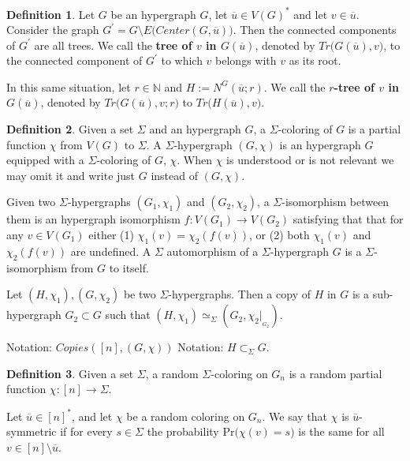 \documentclass[12pt,notitlepage,a4paper]{article}
\theoremstyle{definition}
\newtheorem{definition}{Definition}[section]
\newcommand{\N}{\mathbb{N}}
\begin{document}
\begin{definition}
	Let $G$ be an hypergraph $G$, let $\overline{u}\in V(G)^*$
	and let $v\in \overline{u}$.
	Consider the graph $G^\prime= G\setminus 
	E\big(Center(G,\overline{u})\big)$. Then the connected components of
	$G^\prime$ are all trees. We call the \textbf{tree of $v$ in
	$G(\overline{u})$}, denoted by $Tr\big(G(\overline{u}),v\big)$,
	to the connected component of $G^\prime$ to which $v$ belongs
	with $v$ as its root. \par   
	In this same situation, let $r\in \N$ and $H:=N^G(\overline{u};r)$.
	We call the \textbf{$r$-tree of $v$ in $G(\overline{u})$}, 
	denoted by $Tr\big(G(\overline{u}),v;r\big)$ to 
	$Tr\big(H(\overline{u}),v\big)$.
\end{definition}

\newpage

\begin{definition} 
	Given a set $\Sigma$ and an hypergraph $G$, a $\Sigma$-coloring 
	of $G$ is a partial function $\chi$ from $V(G)$ to $\Sigma$. 
	A $\Sigma$-hypergraph $(G,\chi)$ is an hypergraph $G$ equipped
	with a $\Sigma$-coloring of $G$, $\chi$. When $\chi$ is understood
	or is not relevant we may omit it and write just $G$ instead of $(G,\chi)$.\par
	Given two $\Sigma$-hypergraphs $(G_1,\chi_1)$ and $(G_2,\chi_2)$,
	a $\Sigma$-isomorphism between them is an hypergraph isomorphism 
	$f:V(G_1)\rightarrow V(G_2)$ satisfying that
	that for any $v\in V(G_1)$ 
	either (1) $\chi_1(v)=\chi_2(f(v))$, or (2) both $\chi_1(v)$ and $\chi_2(f(v))$ 
	are undefined.	A $\Sigma$ automorphism of a $\Sigma$-hypergraph $G$ is a 
	$\Sigma$-isomorphism from $G$ to itself.
	 \par
	Let $(H,\chi_1), (G,\chi_2)$ be two $\Sigma$-hypergraphs. Then a copy of $H$ in $G$ is
	a sub-hypergraph $G_2\subset G$ such that 
	$(H,\chi_1) \simeq_\Sigma (G_2,\chi_2|_{_{G_2}})$.	\par
	
	Notation: $Copies([n],(G, \chi))$
	Notation: $H\subset_{\Sigma}G$.

\end{definition}
\begin{definition}
	Given a set $\Sigma$, a random $\Sigma$-coloring on $G_n$ is a random 
	partial function $\chi : [n]\rightarrow \Sigma$. \par
	Let $\overline{u}\in [n]^*$, and let $\chi$ be a random coloring on 
	$G_n$. We say that $\chi$ is $\overline{u}$-symmetric if for every 
	$s\in \Sigma$ the probability $\mathrm{Pr}\big(	\chi(v)=s\big)$ is the
	same for all $v\in [n]\setminus\overline{u}$. 

\end{definition}
	
\end{document}
